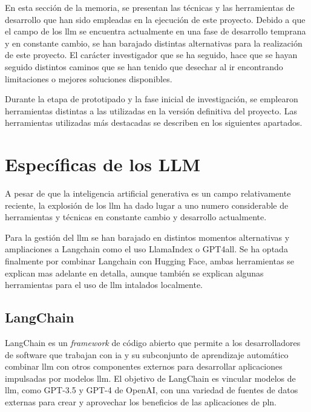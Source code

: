 
En esta sección de la memoria, se presentan las técnicas y las herramientas de desarrollo que han sido empleadas en la ejecución de este proyecto. Debido a que el campo de los \acrshort{llm} se encuentra actualmente en una fase de desarrollo temprana y en constante cambio, se han barajado distintas alternativas para la realización de este proyecto. El carácter investigador que se ha seguido, hace que se hayan seguido distintos caminos que se han tenido que desechar al ir encontrando limitaciones o mejores soluciones disponibles.

Durante la etapa de prototipado y la fase inicial de investigación, se emplearon herramientas distintas a las utilizadas en la versión definitiva del proyecto. Las herramientas utilizadas más destacadas se describen en los siguientes apartados.

\section{Específicas de los LLM}

A pesar de que la inteligencia artificial generativa es un campo relativamente reciente, la explosión de los \acrshort{llm} ha dado lugar a uno numero considerable de herramientas y técnicas en constante cambio y desarrollo actualmente.

Para la gestión del \acrshort{llm} se han barajado en distintos momentos alternativas y ampliaciones a Langchain como el uso LlamaIndex o GPT4all. Se ha optada finalmente por combinar Langchain con Hugging Face, ambas herramientas se explican mas adelante en detalla, aunque también se explican algunas herramientas para el uso de \acrshort{llm} intalados localmente.

\subsection{LangChain}

LangChain es un \textit{framework} de código abierto que permite a los desarrolladores de software que trabajan con \acrfull{ia} y su subconjunto de aprendizaje automático combinar \acrlong{llm} con otros componentes externos para desarrollar aplicaciones impulsadas por modelos \acrshort{llm}. El objetivo de LangChain es vincular modelos de \acrshort{llm}, como GPT-3.5 y GPT-4 de OpenAI, con una variedad de fuentes de datos externas para crear y aprovechar los beneficios de las aplicaciones de \acrfull{pln}.

